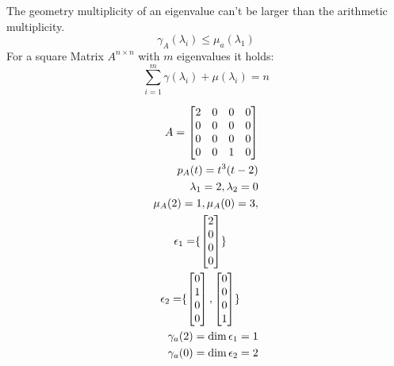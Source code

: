 The geometry multiplicity of an eigenvalue can't be larger than the arithmetic multiplicity.
\begin{equation}
    \gamma_A(\lambda_i) \leq \mu_a(\lambda_1)
\end{equation}
For a square Matrix \(A^{n \times n}\) with \(m\) eigenvalues it holds:
\begin{equation}
    \sum_{i=1}^{m} \gamma(\lambda_i) + \mu(\lambda_i) = n
\end{equation}
\begin{example}
    \begin{align*}
        A = \begin{bmatrix}
            2 & 0 & 0 & 0 \\ 0 & 0 & 0 &0 \\ 0 & 0 &0 &0 \\ 0 & 0 & 1 & 0
        \end{bmatrix}                                                  \\
        p_A(t) = t^3(t- 2)                                                               \\
        \lambda_1 = 2, \lambda_2 = 0                                                     \\
        \mu_A(2) = 1, \mu_A(0) = 3,                                                      \\
        \epsilon_1 = \span \{ \begin{bmatrix}
            2 \\ 0 \\ 0 \\ 0
        \end{bmatrix} \}                             \\
        \epsilon_2 = \span \{ \begin{bmatrix}
            0 \\ 1 \\ 0 \\ 0
        \end{bmatrix}, \begin{bmatrix}
            0 \\ 0 \\ 0 \\ 1
        \end{bmatrix}\} \\
        \gamma_a(2) = \dim \epsilon_1 = 1                                                \\
        \gamma_a(0) = \dim \epsilon_2 = 2
    \end{align*}
\end{example}
